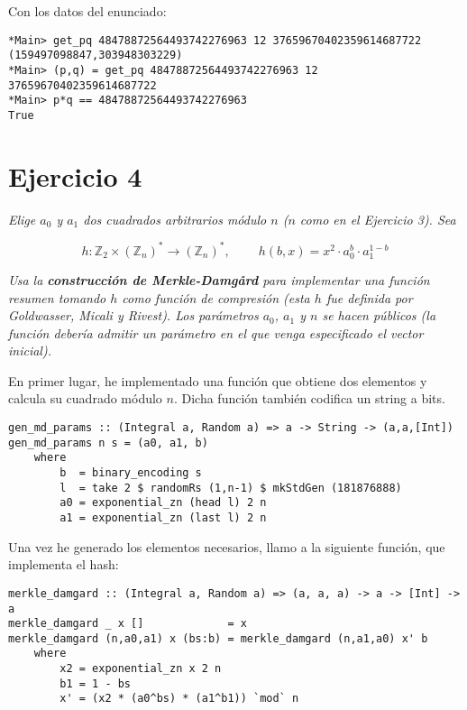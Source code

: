 \documentclass[10pt,spanish]{article}
\begin{document}
Con los datos del enunciado:

\begin{verbatim}
*Main> get_pq 48478872564493742276963 12 37659670402359614687722
(159497098847,303948303229)
*Main> (p,q) = get_pq 48478872564493742276963 12 37659670402359614687722
*Main> p*q == 48478872564493742276963
True
\end{verbatim}

\section{\textcolor{azul}Ejercicio 4}
\textit{Elige $a_0$ y $a_1$ dos cuadrados arbitrarios módulo $n$ ($n$ como en el Ejercicio 3). Sea}

\begin{displaymath}
    h: \mathbb{Z}_2 \times (\mathbb{Z}_n)^* \rightarrow (\mathbb{Z}_n)^*, \qquad\ h(b,x) = x^2 \cdot a_0^b \cdot a_1^{1-b}
\end{displaymath}

\textit{Usa la \textbf{\textcolor{azul}{construcción de Merkle-Damgård}} para implementar una función resumen tomando $h$ como función de compresión (esta $h$ fue definida por Goldwasser, Micali y Rivest). Los parámetros $a_0$, $a_1$ y $n$ se hacen públicos (la función debería admitir un parámetro en el que venga especificado el vector inicial).}

En primer lugar, he implementado una función que obtiene dos elementos y calcula su cuadrado módulo $n$. Dicha función también codifica un string a bits.

\begin{verbatim}
gen_md_params :: (Integral a, Random a) => a -> String -> (a,a,[Int])
gen_md_params n s = (a0, a1, b)
    where
        b  = binary_encoding s
        l  = take 2 $ randomRs (1,n-1) $ mkStdGen (181876888)
        a0 = exponential_zn (head l) 2 n
        a1 = exponential_zn (last l) 2 n
\end{verbatim}

Una vez he generado los elementos necesarios, llamo a la siguiente función, que implementa el hash:

\begin{verbatim}
merkle_damgard :: (Integral a, Random a) => (a, a, a) -> a -> [Int] -> a
merkle_damgard _ x []             = x
merkle_damgard (n,a0,a1) x (bs:b) = merkle_damgard (n,a1,a0) x' b
    where
        x2 = exponential_zn x 2 n
        b1 = 1 - bs
        x' = (x2 * (a0^bs) * (a1^b1)) `mod` n
\end{verbatim}
\end{document}
